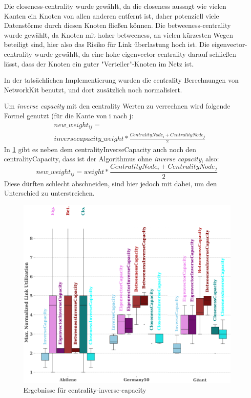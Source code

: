 \documentclass[sigconf, nonacm, review]{acmart}
\begin{document}
Die closeness-centrality wurde gew\"ahlt, da die closeness aussagt wie vielen Kanten ein Knoten von allen anderen entfernt ist, daher potenziell viele Datenst\"orme durch diesen Knoten flie\ss en k\"onnen.
Die betweeness-centrality wurde gew\"ahlt, da Knoten mit hoher betweeness, an vielen k\"urzesten Wegen beteiligt sind, hier also das Risiko f\"ur Link \"uberlastung hoch ist.
Die eigenvector-centrality wurde gew\"ahlt, da eine hohe eigenvector-centrality darauf schlie\ss en l\"asst, dass der Knoten ein guter "Verteiler"-Knoten im Netz ist.

In der tats\"achlichen Implementierung wurden die centrality Berechnungen von NetworkKit benutzt, und dort zus\"atzlich noch normalisiert.

Um \emph{inverse capacity} mit den centrality Werten zu verrechnen wird folgende Formel genutzt (f\"ur die Kante von i nach j:
\begin{align*}
&new\_weight_{ij} =\\
&inverse capacity\_weight * \frac{CentralityNode_i + CentralityNode_j}{2}
\end{align*}
In \ref{fig:kai_p1_results} gibt es neben dem centralityInverseCapacity auch noch den centralityCapacity, dass ist der Algorithmus ohne \emph{inverse capacity}, also:
\[
new\_weight_{ij} = weight * \frac{CentralityNode_i + CentralityNode_j}{2}
\]
Diese d\"urften schlecht abschneiden, sind hier jedoch mit dabei, um den Unterschied zu unterstreichen.


\begin{figure}
\centering
\includegraphics[width=\linewidth]{figures/kai_p1_results.png}
\caption{Ergebnisse f\"ur centrality-inverse-capacity}
\label{fig:kai_p1_results}
\end{figure}
\end{document}
